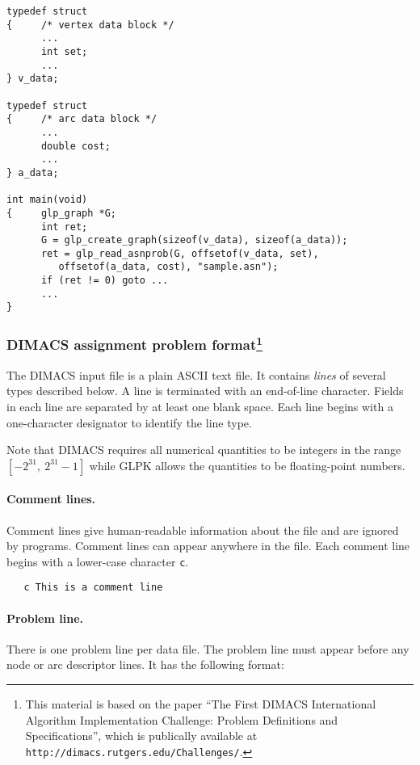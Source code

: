 \documentclass[dvipdfm,11pt]{report}
\begin{document}
\begin{footnotesize}
\begin{verbatim}
typedef struct
{     /* vertex data block */
      ...
      int set;
      ...
} v_data;

typedef struct
{     /* arc data block */
      ...
      double cost;
      ...
} a_data;

int main(void)
{     glp_graph *G;
      int ret;
      G = glp_create_graph(sizeof(v_data), sizeof(a_data));
      ret = glp_read_asnprob(G, offsetof(v_data, set),
         offsetof(a_data, cost), "sample.asn");
      if (ret != 0) goto ...
      ...
}
\end{verbatim}
\end{footnotesize}

\subsubsection*{DIMACS assignment problem format\footnote{This
material is based on the paper ``The First DIMACS International
Algorithm Implementation Challenge: Problem Definitions and
Specifications'', which is publically available at
{\tt http://dimacs.rutgers.edu/Challenges/}.}}
\label{subsecasnprob}

The DIMACS input file is a plain ASCII text file. It contains
{\it lines} of several types described below. A line is terminated with
an end-of-line character. Fields in each line are separated by at least
one blank space. Each line begins with a one-character designator to
identify the line type.

Note that DIMACS requires all numerical quantities to be integers in
the range $[-2^{31},\ 2^{31}-1]$ while GLPK allows the quantities to be
floating-point numbers.

\paragraph{Comment lines.} Comment lines give human-readable information
about the file and are ignored by programs. Comment lines can appear
anywhere in the file. Each comment line begins with a lower-case
character \verb|c|.

\begin{verbatim}
   c This is a comment line
\end{verbatim}

\newpage

\paragraph{Problem line.} There is one problem line per data file. The
problem line must appear before any node or arc descriptor lines. It has
the following format:
\end{document}

